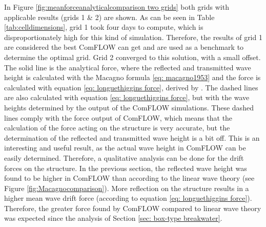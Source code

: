 In Figure \ref{fig:meanforceanalyticalcomparison two grids} both grids with applicable results (grids 1 \& 2) are shown. As can be seen in Table \ref{tab:celldimensions}, grid 1 took four days to compute, which is disproportionately high for this kind of simulation. Therefore, the results of grid 1 are considered the best ComFLOW can get and are used as a benchmark to determine the optimal grid. Grid 2 converged to this solution, with a small offset. The solid line is the analytical force, where the reflected and transmitted wave height is calculated with the Macagno formula \ref{eq: macagno1953} \citep{macagno1953fluid} and the force is calculated with equation \ref{eq: longuethiggins force}, derived by \citet{longuethiggins1977}. The dashed lines are also calculated with equation \ref{eq: longuethiggins force}, but with the wave heights determined by the output of the ComFLOW simulations. These dashed lines comply with the force output of ComFLOW, which means that the calculation of the force acting on the structure is very accurate, but the determination of the reflected and transmitted wave height is a bit off. This is an interesting and useful result, as the actual wave height in ComFLOW can be easily determined. Therefore, a qualitative analysis can be done for the drift forces on the structure. In the previous section, the reflected wave height was found to be higher in ComFLOW than according to the linear wave theory (see Figure \ref{fig:Macagnocomparison}). More reflection on the structure results in a higher mean wave drift force (according to equation \ref{eq: longuethiggins force}). Therefore, the greater force found by ComFLOW compared to linear wave theory was expected since the analysis of Section \ref{sec: box-type breakwater}.




